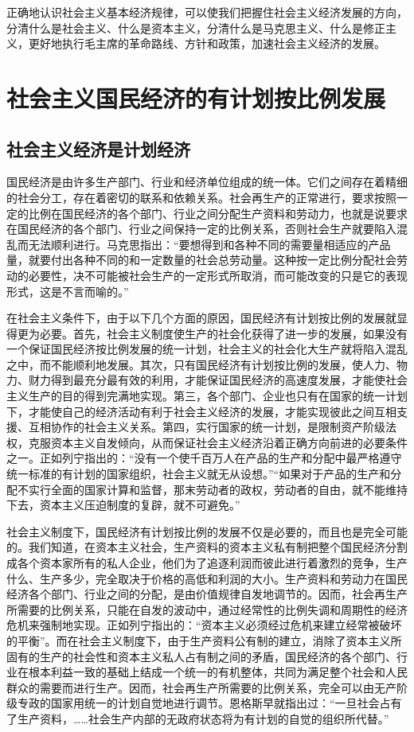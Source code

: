 \documentclass{book}
\begin{document}
正确地认识社会主义基本经济规律，可以使我们把握住社会主义经济发展的方向，分清什么是社会主义、什么是资本主义，分清什么是马克思主义、什么是修正主义，更好地执行毛主席的革命路线、方针和政策，加速社会主义经济的发展。

\section{社会主义国民经济的有计划按比例发展}

\subsection{社会主义经济是计划经济}

国民经济是由许多生产部门、行业和经济单位组成的统一体。它们之间存在着精细的社会分工，存在着密切的联系和依赖关系。社会再生产的正常进行，要求按照一定的比例在国民经济的各个部门、行业之间分配生产资料和劳动力，也就是说要求在国民经济的各个部门、行业之间保持一定的比例关系，否则社会生产就要陷入混乱而无法顺利进行。马克思指出：“要想得到和各种不同的需要量相适应的产品量，就要付出各种不同的和一定数量的社会总劳动量。这种按一定比例分配社会劳动的必要性，决不可能被社会生产的一定形式所取消，而可能改变的只是它的表现形式，这是不言而喻的。”

在社会主义条件下，由于以下几个方面的原因，国民经济有计划按比例的发展就显得更为必要。首先，社会主义制度使生产的社会化获得了进一步的发展，如果没有一个保证国民经济按比例发展的统一计划，社会主义的社会化大生产就将陷入混乱之中，而不能顺利地发展。其次，只有国民经济有计划按比例的发展，使人力、物力、财力得到最充分最有效的利用，才能保证国民经济的高速度发展，才能使社会主义生产的目的得到完满地实现。第三，各个部门、企业也只有在国家的统一计划下，才能使自己的经济活动有利于社会主义经济的发展，才能实现彼此之间互相支援、互相协作的社会主义关系。第四，实行国家的统一计划，是限制资产阶级法权，克服资本主义自发倾向，从而保证社会主义经济沿着正确方向前进的必要条件之一。正如列宁指出的：“没有一个使千百万人在产品的生产和分配中最严格遵守统一标准的有计划的国家组织，社会主义就无从设想。”“如果对于产品的生产和分配不实行全面的国家计算和监督，那末劳动者的政权，劳动者的自由，就不能维持下去，资本主义压迫制度的复辟，就不可避免。”

社会主义制度下，国民经济有计划按比例的发展不仅是必要的，而且也是完全可能的。我们知道，在资本主义社会，生产资料的资本主义私有制把整个国民经济分割成各个资本家所有的私人企业，他们为了追逐利润而彼此进行着激烈的竞争，生产什么、生产多少，完全取决于价格的高低和利润的大小。生产资料和劳动力在国民经济各个部门、行业之间的分配，是由价值规律自发地调节的。因而，社会再生产所需要的比例关系，只能在自发的波动中，通过经常性的比例失调和周期性的经济危机来强制地实现。正如列宁指出的：“资本主义必须经过危机来建立经常被破坏的平衡”。而在社会主义制度下，由于生产资料公有制的建立，消除了资本主义所固有的生产的社会性和资本主义私人占有制之间的矛盾，国民经济的各个部门、行业在根本利益一致的基础上结成一个统一的有机整体，共同为满足整个社会和人民群众的需要而进行生产。因而，社会再生产所需要的比例关系，完全可以由无产阶级专政的国家用统一的计划自觉地进行调节。恩格斯早就指出过：“一旦社会占有了生产资料，……社会生产内部的无政府状态将为有计划的自觉的组织所代替。”
\end{document}
